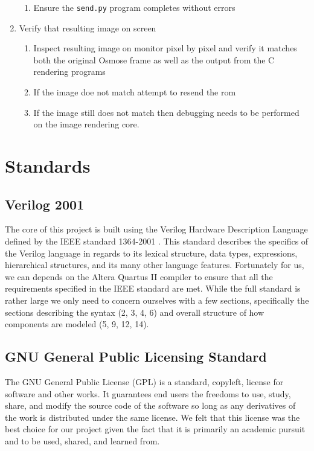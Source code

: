 \documentclass{article}
\begin{document}
\begin{enumerate}
\begin{enumerate}
            \item Ensure the \texttt{send.py} program completes without errors
        \end{enumerate}
    \item Verify that resulting image on screen
        \begin{enumerate}
            \item Inspect resulting image on monitor pixel by pixel and verify it matches both the original Osmose frame as well as the output from the C rendering programs
            \item If the image doe not match attempt to resend the rom
            \item If the image still does not match then debugging needs to be performed on the image rendering core.
        \end{enumerate}
\end{enumerate}

\newpage
\section{Standards}
\subsection{Verilog 2001}

The core of this project is built using the Verilog Hardware Description
Language defined by the IEEE standard 1364-2001 \cite{ieeeverilog}. This
standard describes the specifics of the Verilog language in regards to its
lexical structure, data types, expressions, hierarchical structures, and its
many other language features.  Fortunately for us, we can depends on the Altera
Quartus II compiler to ensure that all the requirements specified in the IEEE
standard are met. While the full standard is rather large we only need to
concern ourselves with a few sections, specifically the sections describing the
syntax (2, 3, 4, 6) and overall structure of how components are modeled (5, 9,
12, 14).

\subsection{GNU General Public Licensing Standard}

The GNU General Public License (GPL) \cite{gpl} is a standard, copyleft,
license for software and other works.  It guarantees end users the freedoms to
use, study, share, and modify the source code of the software so long as any
derivatives of the work is distributed under the same license. We felt that
this license was the best choice for our project given the fact that it is
primarily an academic pursuit and to be used, shared, and learned from.
\end{document}
